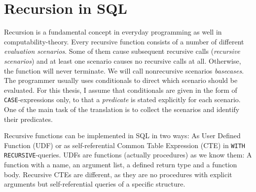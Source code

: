 


\section{Recursion in SQL}

Recursion is a fundamental concept in everyday programming as well in computability-theory. Every recursive function consists of a number of different \textit{evaluation scenarios}. Some of them cause subsequent recursive calls (\textit{recursive scenarios}) and at least one scenario causes no recursive calls at all. Otherwise, the function will never terminate. We will call nonrecursive scenarios \textit{basecases}. The programmer usually uses conditionals to direct which scenario should be evaluated. For this thesis, I assume that conditionals are given in the form of \texttt{CASE}-expressions only, to that a \textit{predicate} is stated explicitly for each scenario. One of the main task of the translation is to collect the scenarios and identify their predicates.

Recursive functions can be implemented in SQL in two ways: As User Defined Function (UDF) or as self-referential Common Table Expression (CTE) in \texttt{WITH RECURSIVE}-queries. UDFs are functions (actually procedures) as we know them: A function with a name, an argument list, a defined return type and a function body. Recursive CTEs are different, as they are no procedures with explicit arguments but self-referential queries of a specific structure.

